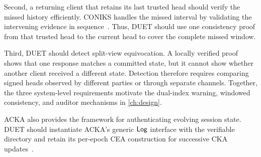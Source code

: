 Second, a returning client that retains its last trusted head should verify the missed history
efficiently. CONIKS handles the missed interval by validating the intervening evidence in
sequence~\cite{melara2015coniks}. Thus, DUET should use one consistency proof from that
trusted head to the current head to cover the complete missed window.

Third, DUET should detect split-view equivocation. A locally verified proof shows that one response
matches a committed state, but it cannot show whether another client received a different state.
Detection therefore requires comparing signed heads observed by different parties or through
separate channels. Together, the three system-level requirements motivate the dual-index warning, windowed
consistency, and auditor mechanisms in \cref{ch:design}.

ACKA also provides the framework for authenticating evolving session state. DUET should
instantiate ACKA's generic $\mathsf{Log}$ interface with the verifiable directory and retain its per-epoch
CEA construction for successive CKA
updates~\cite{dowling2023acka}.

